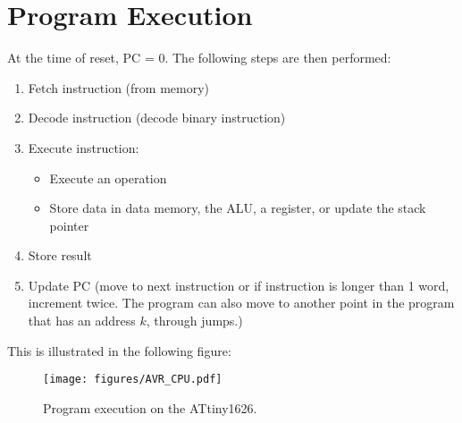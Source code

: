 \documentclass{report}
\begin{document}
\section{Program Execution}
At the time of reset, PC = 0. The following steps are then performed:
\begin{enumerate}
    \item Fetch instruction (from memory)
    \item Decode instruction (decode binary instruction)
    \item Execute instruction:
          \begin{itemize}
              \item Execute an operation
              \item Store data in data memory, the ALU, a register, or
                    update the stack pointer
          \end{itemize}
    \item Store result
    \item Update PC (move to next instruction or if instruction is
          longer than 1 word, increment twice. The program can also
          move to another point in the program that has an address
          \(k\), through jumps.)
\end{enumerate}
This is illustrated in the following figure:
\begin{figure}[H]
    \centering
    \texttt{[image: figures/AVR\_CPU.pdf]}
    \caption{Program execution on the ATtiny1626.} %
\end{figure}
\end{document}
